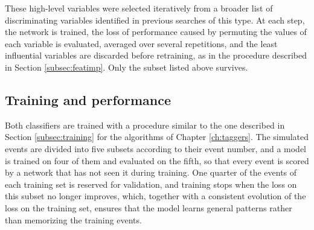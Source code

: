 These high-level variables were selected iteratively from a broader list of discriminating variables identified in previous searches of this type. At each step, the network is trained, the loss of performance caused by permuting the values of each variable is evaluated, averaged over several repetitions, and the least influential variables are discarded before retraining, as in the procedure described in Section \ref{subsec:featimp}. Only the subset listed above survives.
%




\subsection{Training and performance}
% 
Both classifiers are trained with a procedure similar to the one described in Section \ref{subsec:training} for the algorithms of Chapter \ref{ch:taggers}. The simulated events are divided into five subsets according to their event number, and a model is trained on four of them and evaluated on the fifth, so that every event is scored by a network that has not seen it during training. One quarter of the events of each training set is reserved for validation, and training stops when the loss on this subset no longer improves, which, together with a consistent evolution of the loss on the training set, ensures that the model learns general patterns rather than memorizing the training events.


